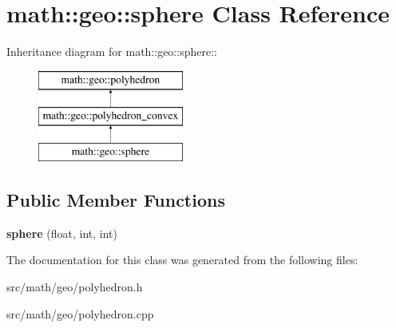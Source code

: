 \hypertarget{classmath_1_1geo_1_1sphere}{
\section{math::geo::sphere Class Reference}
\label{classmath_1_1geo_1_1sphere}
}
Inheritance diagram for math::geo::sphere::\begin{figure}[H]
\begin{center}
\leavevmode
\includegraphics[height=3cm]{classmath_1_1geo_1_1sphere}
\end{center}
\end{figure}
\subsection*{Public Member Functions}
\begin{DoxyCompactItemize}
\item 
\hypertarget{classmath_1_1geo_1_1sphere_ad30f9edddc96ef9c7a4062e79694556d}{
{\bfseries sphere} (float, int, int)}
\label{classmath_1_1geo_1_1sphere_ad30f9edddc96ef9c7a4062e79694556d}

\end{DoxyCompactItemize}


The documentation for this class was generated from the following files:\begin{DoxyCompactItemize}
\item 
src/math/geo/polyhedron.h\item 
src/math/geo/polyhedron.cpp\end{DoxyCompactItemize}
